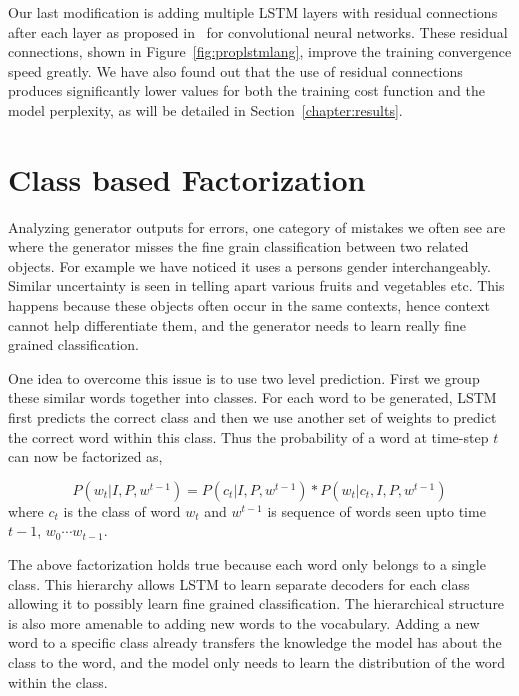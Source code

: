Our last modification is adding multiple LSTM layers with residual connections
after each layer as proposed in~\cite{He2015} for convolutional neural networks.
These residual connections, shown in Figure~\ref{fig:proplstmlang}, improve the
training convergence speed greatly.
We have also found out that the use of residual connections produces
significantly lower values for both the training cost function and the model
perplexity, as will be detailed in Section~\ref{chapter:results}.

\section{Class based Factorization}
Analyzing generator outputs for errors, one category of mistakes we often see
are where the generator misses the fine grain classification between two related
objects.
For example we have noticed it uses a persons gender interchangeably.
Similar uncertainty is seen in telling apart various fruits and vegetables etc.
This happens because these objects often occur in the same contexts, hence
context cannot help differentiate them, and the generator needs to learn really
fine grained classification.

One idea to overcome this issue is to use two level prediction.
First we group these similar words together into classes.
For each word to be generated, LSTM first predicts the correct class and then we
use another set of weights to predict the correct word within this class.
Thus the probability of a word at time-step $t$ can now be factorized as,

\begin{equation}
  \label{eq:class} 
  P(w_t | I,P, w^{t-1}) = P(c_t| I,P, w^{t-1})*P(w_t | c_t, I,P,w^{t-1})
\end{equation}
\noindent where $c_t$ is the class of word $w_t$ and $w^{t-1}$ is sequence of words
seen upto time $t-1$, $w_0\cdots w_{t-1}$.

The above factorization holds true because each word only belongs to a single class.
This hierarchy allows LSTM to learn separate decoders for each class allowing it to
possibly learn fine grained classification.
The hierarchical structure is also more amenable to adding new words to the vocabulary.
Adding a new word to a specific class already transfers the knowledge the model
has about the class to the word, and the model only needs to learn the
distribution of the word within the class.

